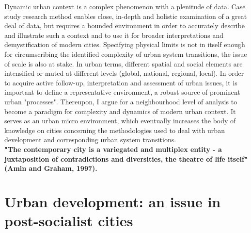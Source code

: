 \documentclass[11pt]{report}
\begin{document}
Dynamic urban context is a complex phenomenon with a plenitude of data. Case study research method enables close, in-depth and holistic examination of a great deal of data, but requires a bounded environment in order to accurately describe and illustrate such a context and to use it for broader interpretations and demystification of modern cities. Specifying physical limits is not in itself enough for circumscribing the identified complexity of urban system transitions, the issue of scale is also at stake. In urban terms, different spatial and social elements are intensified or muted at different levels (global, national, regional, local). In order to acquire active follow-up, interpretation and assessment of urban issues, it is important to define a representative environment, a robust source of prominent urban "processes". Thereupon, I argue for a neighbourhood level of analysis to become a paradigm for complexity and dynamics of modern urban context. It serves as an urban micro environment, which eventually increases the body of knowledge on cities concerning the methodologies used to deal with urban development and corresponding urban system transitions.
\\
\textbf{"The contemporary city is a variegated and multiplex entity - a juxtaposition of contradictions and diversities, the theatre of life itself" (Amin and Graham, 1997).}

\section{Urban development: an issue in post-socialist cities}
\end{document}

